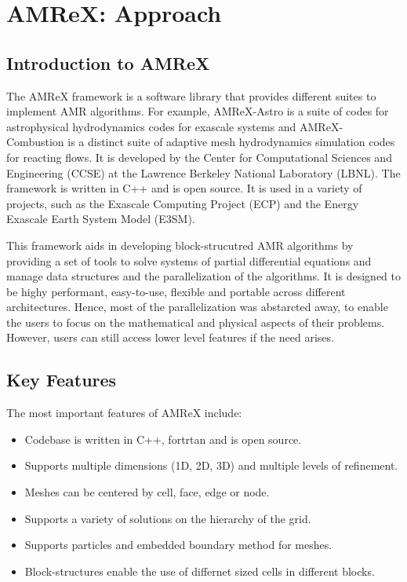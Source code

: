 \documentclass[12pt, a4paper]{scrartcl}
\begin{document}
\section{AMReX: Approach}
\subsection{Introduction to AMReX}

The AMReX framework is a software library that provides different suites to implement AMR algorithms.
For example, AMReX-Astro is a suite of codes for astrophysical hydrodynamics codes for exascale systems and AMReX-
Combustion is a distinct suite of adaptive mesh hydrodynamics simulation codes for reacting flows.
It is developed by the Center for Computational Sciences and Engineering (CCSE) at the Lawrence Berkeley National Laboratory (LBNL).
The framework is written in C++ and is open source. It is used in a variety of projects, such as the
Exascale Computing Project (ECP) and the Energy Exascale Earth System Model (E3SM).

This framework aids in developing block-strucutred AMR algorithms by providing a set of tools to
solve systems of partial differential equations and manage data structures and the parallelization of the algorithms.
It is designed to be highy performant, easy-to-use, flexible and portable across different architectures.
Hence, most of the parallelization was abstarcted away, to enable the users to focus on the mathematical and physical
aspects of their problems. However, users can still access lower level features if the need arises.

\subsection{Key Features}

The most important features of AMReX include:

\begin{itemize}
    \item Codebase is written in C++, fortrtan and is open source.
    \item Supports multiple dimensions (1D, 2D, 3D) and multiple levels of refinement.
    \item Meshes can be centered by cell, face, edge or node.
    \item Supports a variety of solutions on the hierarchy of the grid.
    \item Supports particles and embedded boundary method for meshes.
    \item Block-structures enable the use of differnet sized cells in different blocks.
\end{itemize}
\end{document}
